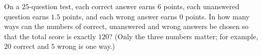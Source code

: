 On a $25$-question test, each correct answer earns $6$ points, each unanswered question earns $1.5$ points, and each wrong answer earns $0$ points. In how many ways can the numbers of correct, unanswered and wrong answers be chosen so that the total score is exactly $120$? (Only the three numbers matter; for example, $20$ correct and $5$ wrong is one way.)
